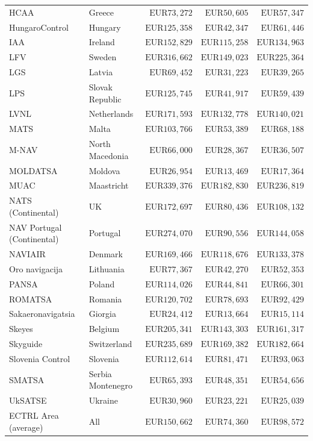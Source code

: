 \documentclass[
  11pt,
  a4paper,
]{book}
\begin{document}
\begin{longtable}{llrrr}
HCAA & Greece & $\text{EUR}73,272$ & $\text{EUR}50,605$ & $\text{EUR}57,347$ \\ 
HungaroControl & Hungary & $\text{EUR}125,358$ & $\text{EUR}42,347$ & $\text{EUR}61,446$ \\ 
IAA & Ireland & $\text{EUR}152,829$ & $\text{EUR}115,258$ & $\text{EUR}134,963$ \\ 
LFV & Sweden & $\text{EUR}316,662$ & $\text{EUR}149,023$ & $\text{EUR}225,364$ \\ 
LGS & Latvia & $\text{EUR}69,452$ & $\text{EUR}31,223$ & $\text{EUR}39,265$ \\ 
LPS & Slovak Republic & $\text{EUR}125,745$ & $\text{EUR}41,917$ & $\text{EUR}59,439$ \\ 
LVNL & Netherlands & $\text{EUR}171,593$ & $\text{EUR}132,778$ & $\text{EUR}140,021$ \\ 
MATS & Malta & $\text{EUR}103,766$ & $\text{EUR}53,389$ & $\text{EUR}68,188$ \\ 
M-NAV & North Macedonia & $\text{EUR}66,000$ & $\text{EUR}28,367$ & $\text{EUR}36,507$ \\ 
MOLDATSA & Moldova & $\text{EUR}26,954$ & $\text{EUR}13,469$ & $\text{EUR}17,364$ \\ 
MUAC & Maastricht & $\text{EUR}339,376$ & $\text{EUR}182,830$ & $\text{EUR}236,819$ \\ 
NATS (Continental) & UK & $\text{EUR}172,697$ & $\text{EUR}80,436$ & $\text{EUR}108,132$ \\ 
NAV Portugal (Continental) & Portugal & $\text{EUR}274,070$ & $\text{EUR}90,556$ & $\text{EUR}144,058$ \\ 
NAVIAIR & Denmark & $\text{EUR}169,466$ & $\text{EUR}118,676$ & $\text{EUR}133,378$ \\ 
Oro navigacija & Lithuania & $\text{EUR}77,367$ & $\text{EUR}42,270$ & $\text{EUR}52,353$ \\ 
PANSA & Poland & $\text{EUR}114,026$ & $\text{EUR}44,841$ & $\text{EUR}66,301$ \\ 
ROMATSA & Romania & $\text{EUR}120,702$ & $\text{EUR}78,693$ & $\text{EUR}92,429$ \\ 
Sakaeronavigatsia & Giorgia & $\text{EUR}24,412$ & $\text{EUR}13,664$ & $\text{EUR}15,114$ \\ 
Skeyes & Belgium & $\text{EUR}205,341$ & $\text{EUR}143,303$ & $\text{EUR}161,317$ \\ 
Skyguide & Switzerland & $\text{EUR}235,689$ & $\text{EUR}169,382$ & $\text{EUR}182,664$ \\ 
Slovenia Control & Slovenia & $\text{EUR}112,614$ & $\text{EUR}81,471$ & $\text{EUR}93,063$ \\ 
SMATSA & Serbia Montenegro & $\text{EUR}65,393$ & $\text{EUR}48,351$ & $\text{EUR}54,656$ \\ 
UkSATSE & Ukraine & $\text{EUR}30,960$ & $\text{EUR}23,221$ & $\text{EUR}25,039$ \\ 
ECTRL Area (average) & All & $\text{EUR}150,662$ & $\text{EUR}74,360$ & $\text{EUR}98,572$ \\ 
\bottomrule
\end{longtable}
\end{document}
